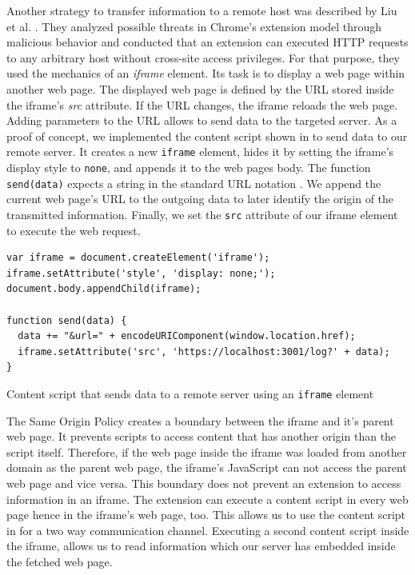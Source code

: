 		Another strategy to transfer information to a remote host was described by Liu et al. \cite{Liu12chromeextensions:}. They analyzed possible threats in Chrome's extension model through malicious behavior and conducted that an extension can executed HTTP requests to any arbitrary host without cross-site access privileges. For that purpose, they used the mechanics of an \textit{iframe} element. Its task is to display a web page within another web page. The displayed web page is defined by the URL stored inside the iframe's \textit{src} attribute. If the URL changes, the iframe reloads the web page. Adding parameters to the URL allows to send data to the targeted server. As a proof of concept, we implemented the content script shown in  to send data to our remote server. It creates a new \texttt{iframe} element, hides it by setting the iframe's display style to \texttt{none}, and appends it to the web pages body. The function \texttt{send(data)} expects a string in the standard URL notation \cite{w3cUrlSpecifications}. We append the current web page's URL to the outgoing data to later identify the origin of the transmitted information. Finally, we set the \texttt{src} attribute of our iframe element to execute the web request. \\
		
		\begin{code}
			\begin{lstlisting}
var iframe = document.createElement('iframe');
iframe.setAttribute('style', 'display: none;');
document.body.appendChild(iframe);

function send(data) {
  data += "&url=" + encodeURIComponent(window.location.href);
  iframe.setAttribute('src', 'https://localhost:3001/log?' + data);
}
			\end{lstlisting}
			\caption{Content script that sends data to a remote server using an \texttt{iframe} element}
			\label{contentScriptSendDataWithIframe}
		\end{code}
		
		The Same Origin Policy creates a boundary between the iframe and it's parent web page. It prevents scripts to access content that has another origin than the script itself. Therefore, if the web page inside the iframe was loaded from another domain as the parent web page, the iframe's JavaScript can not access the parent web page and vice versa. This boundary does not prevent an extension to access information in an iframe. The extension can execute a content script in every web page hence in the iframe's web page, too. This allows us to use the content script in  for a two way communication channel. Executing a second content script inside the iframe, allows us to read information which our server has embedded inside the fetched web page. \\
		
